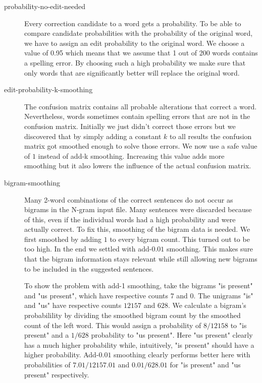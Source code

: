 \documentclass[11pt,a4paper]{article}
\begin{document}
\begin{description}
\item[probability-no-edit-needed] Every correction candidate to a word gets a probability. To be able to compare candidate probabilities with the probability of the original word, we have to assign an edit probability to the original word. We choose a value of 0.95 which means that we assume that 1 out of 200 words contains a spelling error. By choosing such a high probability we make sure that only words that are significantly better will replace the original word.

\item[edit-probability-k-smoothing] The confusion matrix contains all probable alterations that correct a word. Nevertheless, words sometimes contain spelling errors that are not in the confusion matrix. Initially we just didn't correct those errors but we discovered that by simply adding a constant $k$ to all results the confusion matrix got smoothed enough to solve those errors. We now use a safe value of $1$ instead of add-k smoothing. Increasing this value adds more smoothing but it also lowers the influence of the actual confusion matrix.

\item[bigram-smoothing] Many 2-word combinations of the correct sentences do not occur as bigrams in the N-gram input file. Many sentences were discarded because of this, even if the individual words had a high probability and were actually correct. To fix this, smoothing of the bigram data is needed. We first smoothed by adding $1$ to every bigram count. This turned out to be too high. In the end we settled with add-$0.01$ smoothing. This makes sure that the bigram information stays relevant while still allowing new bigrams to be included in the suggested sentences.

To show the problem with add-1 smoothing, take the bigrams "is present" and "us present", which have respective counts $7$ and $0$. The unigrams "is" and "us" have respective counts $12157$ and $628$. We calculate a bigram's probabilility by dividing the smoothed bigram count by the smoothed count of the left word. This would assign a probability of $8/12158$ to "is present" and a $1/628$ probability to "us present". Here "us present" clearly has a much higher probability while, intuitively, "is present" should have a higher probability. Add-$0.01$ smoothing clearly performs better here with probabilities of $7.01/12157.01$ and $0.01/628.01$ for "is present" and "us present" respectively.
\end{description}
\end{document}
